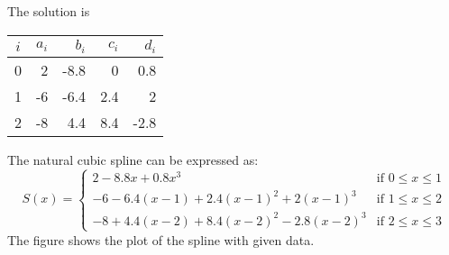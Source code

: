 \documentclass[]{book}
\begin{document}
The solution is
\begin{center}
\begin{tabular}{c|rrrr}
$i$ & $a_{i}$ & $b_{i}$ & $c_{i}$ & $d_{i}$\\
\hline
0 & 2 & -8.8 & 0 & 0.8\\
1 & -6 & -6.4 & 2.4 & 2\\
2 & -8 & 4.4 & 8.4 & -2.8
\end{tabular}
\end{center}
The natural cubic spline can be expressed as:
\begin{equation}
S(x) = \begin{cases} 2-8.8x+0.8x^{3} & \mbox{if } 0\leq x\leq 1\\
-6-6.4(x-1)+2.4{(x-1)}^{2}+2{(x-1)}^{3} & \mbox{if } 1\leq x\leq 2\\
-8+4.4(x-2)+8.4{(x-2)}^{2}-2.8{(x-2)}^{3} & \mbox{if } 2\leq x\leq 3\end{cases}
\end{equation}
The figure shows the plot of the spline with given data.
\begin{center}
\end{center}
\end{document}
